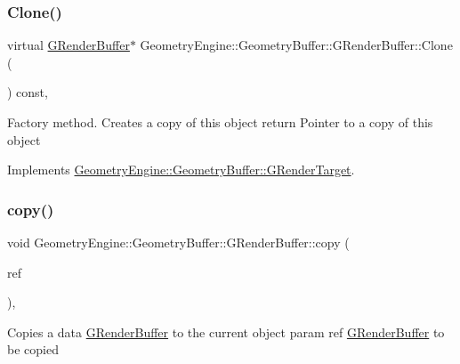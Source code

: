 \subsubsection{\texorpdfstring{Clone()}{Clone()}}
{\footnotesize\ttfamily virtual \mbox{\hyperlink{class_geometry_engine_1_1_geometry_buffer_1_1_g_render_buffer}{G\+Render\+Buffer}}$\ast$ Geometry\+Engine\+::\+Geometry\+Buffer\+::\+G\+Render\+Buffer\+::\+Clone (\begin{DoxyParamCaption}{ }\end{DoxyParamCaption}) const\hspace{0.3cm}{\ttfamily [inline]}, {\ttfamily [virtual]}}

Factory method. Creates a copy of this object return Pointer to a copy of this object 

Implements \mbox{\hyperlink{class_geometry_engine_1_1_geometry_buffer_1_1_g_render_target_a3b14d8929cf9d2acb6bc263c709ff019}{Geometry\+Engine\+::\+Geometry\+Buffer\+::\+G\+Render\+Target}}.

\mbox{\label{class_geometry_engine_1_1_geometry_buffer_1_1_g_render_buffer_ad747a5783a7c5cbae9f4ad9aea753896}} 
\subsubsection{\texorpdfstring{copy()}{copy()}}
{\footnotesize\ttfamily void Geometry\+Engine\+::\+Geometry\+Buffer\+::\+G\+Render\+Buffer\+::copy (\begin{DoxyParamCaption}\item[{const \mbox{\hyperlink{class_geometry_engine_1_1_geometry_buffer_1_1_g_render_buffer}{G\+Render\+Buffer}} \&}]{ref }\end{DoxyParamCaption})\hspace{0.3cm}{\ttfamily [protected]}, {\ttfamily [virtual]}}

Copies a data \mbox{\hyperlink{class_geometry_engine_1_1_geometry_buffer_1_1_g_render_buffer}{G\+Render\+Buffer}} to the current object param ref \mbox{\hyperlink{class_geometry_engine_1_1_geometry_buffer_1_1_g_render_buffer}{G\+Render\+Buffer}} to be copied \mbox{\label{class_geometry_engine_1_1_geometry_buffer_1_1_g_render_buffer_afb80727ba33997fb7f48551de1831111}} 
